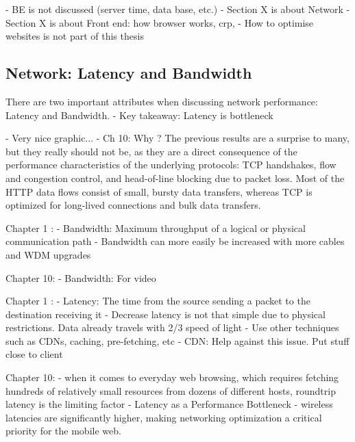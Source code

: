 - BE is not discussed (server time, data base, etc.)
- Section X is about Network
- Section X is about Front end: how browser works, crp, 
- How to optimise websites is not part of this thesis





\subsection{Network: Latency and Bandwidth}

There are two important attributes when discussing network performance: Latency and Bandwidth.
- Key takeaway: Latency is bottleneck

- Very nice graphic...
- Ch 10: Why ? The previous results are a surprise to many, but they really should not be, as they are a direct consequence of the performance characteristics of the underlying protocols: TCP handshakes, flow and congestion control, and head-of-line blocking due to packet loss. Most of the HTTP data flows consist of small, bursty data transfers, whereas TCP is optimized for long-lived connections and bulk data transfers.



Chapter 1 :
- Bandwidth: Maximum throughput of a logical or physical communication path
- Bandwidth can more easily be increased with more cables and WDM upgrades

Chapter 10:
- Bandwidth: For video



Chapter 1 :
- Latency: The time from the source sending a packet to the destination receiving it
- Decrease latency is not that simple due to physical restrictions. Data already travels with 2/3 speed of light
- Use other techniques such as CDNs, caching, pre-fetching, etc
- CDN: Help against this issue. Put stuff close to client

Chapter 10:
- when it comes to everyday web browsing, which requires fetching hundreds of relatively small resources from dozens of different hosts, roundtrip latency is the limiting factor
- Latency as a Performance Bottleneck
-  wireless latencies are significantly higher, making networking optimization a critical priority for the mobile web.


